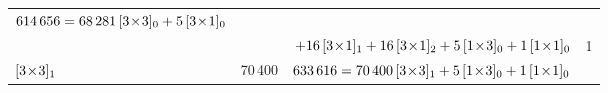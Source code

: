 \begin{table}
\begin{center}
{\begin{tabular}{lrlr}
                         $ 614\,656 = 68\,281\,{[3\!\times\!3]_{0}}
                         +  5\,{[3\!\times\!1]_{0}}$  %
                                                 &   \\
                      &       & $\,
                         + 16\,\BravCell{3}{1}{1} +16 \,\BravCell{3}{1}{2}
                         +  5\,\BravCell{1}{3}{0}
                         + {1}\,\BravCell{1}{1}{0}$
                                                 & 1  \\
${[3\!\times\!3]_{1}}$& 70\,400  &
                         $ 633\,616 =70\,400\,\BravCell{3}{3}{1}
                         + {5}\,\BravCell{1}{3}{0} %
                         + {1}\,\BravCell{1}{1}{0}$
                                                 &   \\
\end{tabular}
} %
\end{center}
\end{table}
